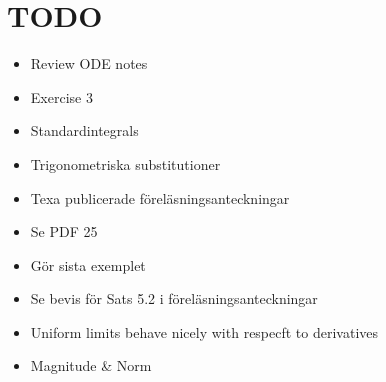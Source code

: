 \section{TODO}\par
\begin{itemize}
  \item Review ODE notes
  \item Exercise 3
  \item Standardintegrals
  \item Trigonometriska substitutioner
  \item Texa publicerade föreläsningsanteckningar 
  \item Se PDF 25
  \item Gör sista exemplet
  \item Se bevis för Sats 5.2 i föreläsningsanteckningar
  \item Uniform limits behave nicely with respecft to derivatives
  \item Magnitude \& Norm
\end{itemize}
